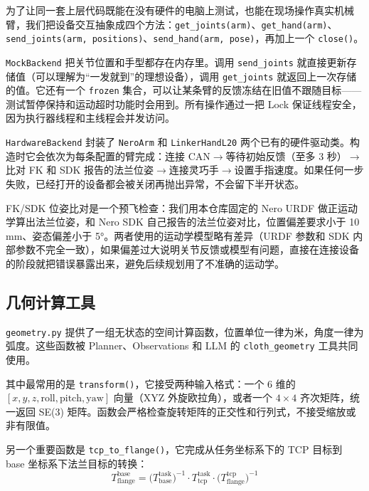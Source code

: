 为了让同一套上层代码既能在没有硬件的电脑上测试，也能在现场操作真实机械臂，我们把设备交互抽象成四个方法：\texttt{get\_joints(arm)}、\texttt{get\_hand(arm)}、\texttt{send\_joints(arm, positions)}、\texttt{send\_hand(arm, pose)}，再加上一个 \texttt{close()}。

\texttt{MockBackend} 把关节位置和手型都存在内存里。调用 \texttt{send\_joints} 就直接更新存储值（可以理解为``一发就到''的理想设备），调用 \texttt{get\_joints} 就返回上一次存储的值。它还有一个 \texttt{frozen} 集合，可以让某条臂的反馈冻结在旧值不跟随目标——测试暂停保持和运动超时功能时会用到。所有操作通过一把 Lock 保证线程安全，因为执行器线程和主线程会并发访问。

\texttt{HardwareBackend} 封装了 \texttt{NeroArm} 和 \texttt{LinkerHandL20} 两个已有的硬件驱动类。构造时它会依次为每条配置的臂完成：连接 CAN$\to$等待初始反馈（至多 3 秒）$\to$比对 FK 和 SDK 报告的法兰位姿$\to$连接灵巧手$\to$设置手指速度。如果任何一步失败，已经打开的设备都会被关闭再抛出异常，不会留下半开状态。

FK/SDK 位姿比对是一个预飞检查：我们用本仓库固定的 Nero URDF 做正运动学算出法兰位姿，和 Nero SDK 自己报告的法兰位姿对比，位置偏差要求小于 10\,mm、姿态偏差小于 5°。两者使用的运动学模型略有差异（URDF 参数和 SDK 内部参数不完全一致），如果偏差过大说明关节反馈或模型有问题，直接在连接设备的阶段就把错误暴露出来，避免后续规划用了不准确的运动学。


\subsection{几何计算工具}
\label{subsec:agent-geometry}

\texttt{geometry.py} 提供了一组无状态的空间计算函数，位置单位一律为米，角度一律为弧度。这些函数被 Planner、Observations 和 LLM 的 \texttt{cloth\_geometry} 工具共同使用。

其中最常用的是 \texttt{transform()}，它接受两种输入格式：一个 6 维的 $[x, y, z, \text{roll}, \text{pitch}, \text{yaw}]$ 向量（XYZ 外旋欧拉角），或者一个 $4\times4$ 齐次矩阵，统一返回 SE(3) 矩阵。函数会严格检查旋转矩阵的正交性和行列式，不接受缩放或非有限值。

另一个重要函数是 \texttt{tcp\_to\_flange()}，它完成从任务坐标系下的 TCP 目标到 base 坐标系下法兰目标的转换：
\begin{equation}
  T_{\text{flange}}^{\text{base}} = \bigl(T_{\text{base}}^{\text{task}}\bigr)^{-1} \cdot T_{\text{tcp}}^{\text{task}} \cdot \bigl(T_{\text{flange}}^{\text{tcp}}\bigr)^{-1}
  \label{eq:tcp2flange}
\end{equation}

